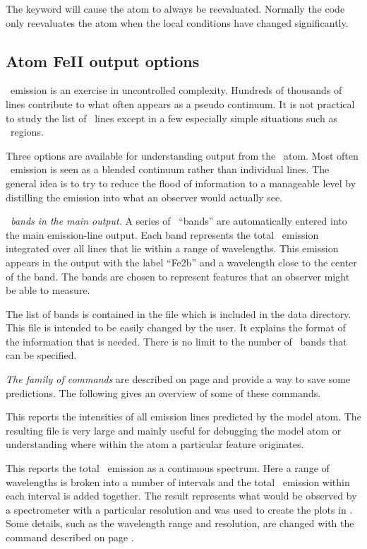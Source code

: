 The keyword  will cause the atom to always be reevaluated.  Normally
the code only reevaluates the atom when the local conditions have changed
significantly.

\subsection{Atom FeII output options}

\feii\ emission is an exercise in uncontrolled complexity.  Hundreds of
thousands of lines contribute to what often appears as a pseudo continuum.
It is not practical to study the list of \feii\ lines
except in a few especially
simple situations such as \hii\ regions.

Three options are available for understanding output from the \feii\ atom.
Most often \feii\ emission is seen as a blended continuum rather than
individual lines.  The general idea is to try to reduce the flood of
information to a manageable level by distilling the emission into what an
observer would actually see.

\emph{\feii\ bands in the main output.}  A series of \feii\ ``bands'' are
automatically entered into the main emission-line output.
Each band represents the total \feii\ emission integrated
over all lines that lie within a range of wavelengths.
This emission appears
in the output with the label ``Fe2b'' and a wavelength close to the center
of the band.
The bands are chosen to represent features that an observer
might be able to measure.

The list of bands is contained in the file
which is included in the data directory.
This file is intended to be easily changed
by the user.
It explains the format of the information that is needed.
There is no limit to the number of \feii\ bands that can be specified.

\emph{The  family of commands}
are described on page \pageref{sec:CommandSaveFeII}
and provide a way to save some predictions.
The following gives an overview of some of these commands.

  This reports the intensities
of all emission
lines predicted by the model atom.
The resulting file is very large and
mainly useful for debugging the model atom or understanding where within
the atom a particular feature originates.

  This reports the
total \feii\ emission as a continuous spectrum.
Here a range of wavelengths is broken into a number
of intervals and the total \feii\ emission within each interval is added
together.
The result represents what would be observed by a spectrometer
with a particular resolution and was used to create the plots
in \citet{Baldwin2004}.
Some details, such as the wavelength range and resolution,
are changed with the  command
described on page \pageref{sec:CommandSetFeIIContinuum}.

